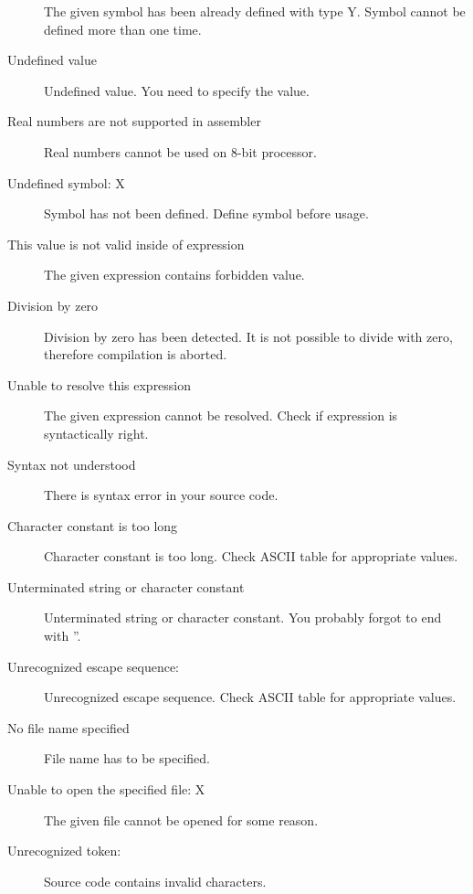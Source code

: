 \begin{description}
                The given symbol has been already defined with type Y. Symbol cannot be defined more than one time.
            \item[Undefined value ]
                Undefined value. You need to specify the value.
            \item[Real numbers are not supported in assembler ]
                Real numbers cannot be used on 8-bit processor.
            \item[Undefined symbol: X ]
                Symbol has not been defined. Define symbol before usage.
            \item[This value is not valid inside of expression ]
                The given expression contains forbidden value.
            \item[Division by zero ]
                Division by zero has been detected. It is not possible to divide with zero, therefore compilation is aborted.
            \item[Unable to resolve this expression ]
                The given expression cannot be resolved. Check if expression is syntactically right.
            \item[Syntax not understood ]
                There is syntax error in your source code.
            \item[Character constant is too long ]
                Character constant is too long. Check ASCII table for appropriate values.
            \item[Unterminated string or character constant ]
                Unterminated string or character constant. You probably forgot to end with ''.
            \item[Unrecognized escape sequence: ]
                Unrecognized escape sequence. Check ASCII table for appropriate values.
            \item[No file name specified ]
                File name has to be specified.
            \item[Unable to open the specified file: X]
                The given file cannot be opened for some reason.
            \item[Unrecognized token:  ]
                Source code contains invalid characters.
        \end{description}

